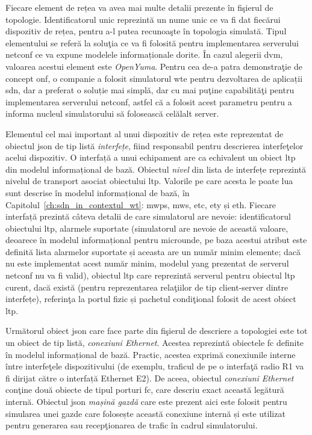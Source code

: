 Fiecare element de rețea va avea mai multe detalii prezente în fişierul de topologie. Identificatorul unic reprezintă un nume unic ce va fi dat fiecărui dispozitiv de rețea, pentru a-l putea recunoaşte în topologia simulată. Tipul elementului se referă la soluţia ce va fi folosită pentru implementarea serverului \gls{netconf} ce va expune modelele informaționale dorite. În cazul alegerii \gls{dvm}, valoarea acestui element este \textit{OpenYuma}. Pentru cea de-a patra demonstraţie de concept \gls{onf}, o companie a folosit simulatorul \gls{wte} pentru dezvoltarea de aplicații \gls{sdn}, dar a preferat o soluție mai simplă, dar cu mai puţine capabilităţi pentru implementarea serverului \gls{netconf}, astfel că a folosit acest parametru pentru a informa nucleul simulatorului să folosească celălalt server. 

Elementul cel mai important al unui dispozitiv de rețea este reprezentat de obiectul \gls{json} de tip listă \textit{interfețe}, fiind responsabil pentru descrierea interfeţelor acelui dispozitiv. O interfață a unui echipament are ca echivalent un obiect \gls{ltp} din modelul informațional de bază. Obiectul \textit{nivel} din lista de interfețe reprezintă nivelul de transport asociat obiectului \gls{ltp}. Valorile pe care acesta le poate lua sunt descrise în modelul informațional de bază, în Capitolul~\ref{ch:sdn_in_contextul_wt}: \gls{mwps}, \gls{mws}, \gls{etc}, \gls{ety} și \gls{eth}. Fiecare interfață prezintă câteva detalii de care simulatorul are nevoie: identificatorul obiectului \gls{ltp}, alarmele suportate (simulatorul are nevoie de această valoare, deoarece în modelul informațional pentru microunde, pe baza acestui atribut este definită lista alarmelor suportate și aceasta are un număr minim elemente; dacă nu este implementat acest număr minim, modelul \gls{yang} prezentat de serverul \gls{netconf} nu va fi valid), obiectul \gls{ltp} care reprezintă serverul pentru obiectul \gls{ltp} curent, dacă există (pentru reprezentarea relaţiilor de tip client-server dintre interfețe), referinţa la portul fizic și pachetul condiţional folosit de acest obiect \gls{ltp}.

Următorul obiect \gls{json} care face parte din fişierul de descriere a topologiei este tot un obiect de tip listă, \textit{conexiuni Ethernet}. Acestea reprezintă obiectele \gls{fc} definite în modelul informațional de bază. Practic, acestea exprimă conexiunile interne între interfeţele dispozitivului (de exemplu, traficul de pe o interfaţă radio R1 va fi dirijat către o interfață Ethernet E2). De aceea, obiectul \textit{conexiuni Ethernet} conţine două obiecte de tipul porturi \gls{fc}, care descriu exact această legătură internă. Obiectul \gls{json} \textit{mașină gazdă} care este prezent aici este folosit pentru simularea unei gazde care folosește această conexiune internă și este utilizat pentru generarea sau recepţionarea de trafic în cadrul simulatorului.

